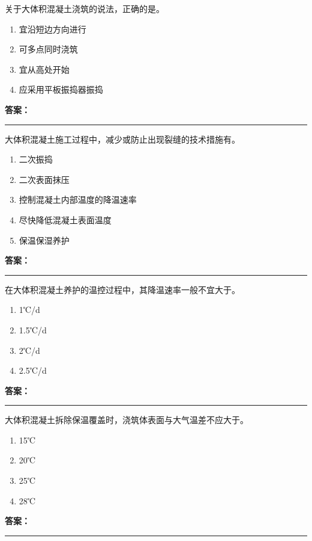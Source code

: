 \documentclass[UTF8,fontset=fandol,11pt]{ctexart}
\newcommand{\answerline}{\textcolor{answerred}{\rule{2.4cm}{0.7pt}}}
\begin{document}
\begin{quizbox}[title={第 81 题}]
关于大体积混凝土浇筑的说法，正确的是。\\
\begin{enumerate}[label=\Alph*.]
\item 宜沿短边方向进行
\item 可多点同时浇筑
\item 宜从高处开始
\item 应采用平板振捣器振捣
\end{enumerate}
\textbf{\textcolor{answerred}{答案：}} \answerline
\end{quizbox}

\begin{quizbox}[title={第 82 题}]
大体积混凝土施工过程中，减少或防止出现裂缝的技术措施有。\\
\begin{enumerate}[label=\Alph*.]
\item 二次振捣
\item 二次表面抹压
\item 控制混凝土内部温度的降温速率
\item 尽快降低混凝土表面温度
\item 保温保湿养护
\end{enumerate}
\textbf{\textcolor{answerred}{答案：}} \answerline
\end{quizbox}

\begin{quizbox}[title={第 83 题}]
在大体积混凝土养护的温控过程中，其降温速率一般不宜大于。\\
\begin{enumerate}[label=\Alph*.]
\item 1℃/d
\item 1.5℃/d
\item 2℃/d
\item 2.5℃/d
\end{enumerate}
\textbf{\textcolor{answerred}{答案：}} \answerline
\end{quizbox}

\begin{quizbox}[title={第 84 题}]
大体积混凝土拆除保温覆盖时，浇筑体表面与大气温差不应大于。\\
\begin{enumerate}[label=\Alph*.]
\item 15℃
\item 20℃
\item 25℃
\item 28℃
\end{enumerate}
\textbf{\textcolor{answerred}{答案：}} \answerline
\end{quizbox}
\end{document}

